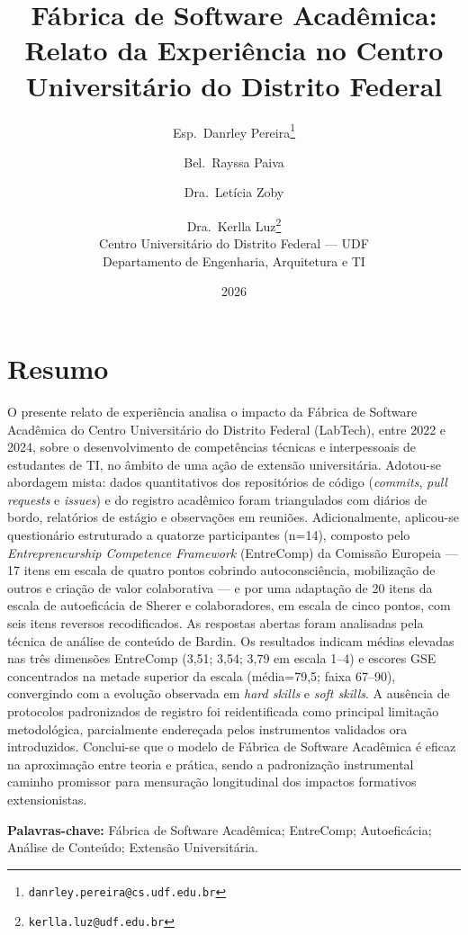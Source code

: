 \documentclass[12pt,a4paper]{article}
\title{\textbf{F\'abrica de Software Acad\^emica:\\
Relato da Experi\^encia no Centro Universit\'ario do Distrito Federal}}
\author{
  Esp.~Danrley Pereira\thanks{\texttt{danrley.pereira@cs.udf.edu.br}} \and
  Bel.~Rayssa Paiva \and
  Dra.~Let\'icia Zoby \and
  Dra.~Kerlla Luz\thanks{\texttt{kerlla.luz@udf.edu.br}} \\
  \small Centro Universit\'ario do Distrito Federal --- UDF \\
  \small Departamento de Engenharia, Arquitetura e TI
}
\date{2026}
\begin{document}
\maketitle

\section*{Resumo}
O presente relato de experi\^encia analisa o impacto da F\'abrica de
Software Acad\^emica do Centro Universit\'ario do Distrito Federal
(LabTech), entre 2022 e 2024, sobre o desenvolvimento de compet\^encias
t\'ecnicas e interpessoais de estudantes de TI, no \^ambito de uma a\c{c}\~ao
de extens\~ao universit\'aria. Adotou-se abordagem mista: dados
quantitativos dos reposit\'orios de c\'odigo (\emph{commits},
\emph{pull requests} e \emph{issues}) e do registro acad\^emico foram
triangulados com di\'arios de bordo, relat\'orios de est\'agio e observa\c{c}\~oes
em reuni\~oes. Adicionalmente, aplicou-se question\'ario estruturado a
quatorze participantes (n=14), composto pelo \emph{Entrepreneurship
Competence Framework} (EntreComp) da Comiss\~ao Europeia --- 17 itens em
escala de quatro pontos cobrindo autoconsci\^encia, mobiliza\c{c}\~ao de outros
e cria\c{c}\~ao de valor colaborativa --- e por uma adapta\c{c}\~ao de 20
itens da escala de autoefic\'acia de Sherer e colaboradores, em escala de
cinco pontos, com seis itens reversos recodificados. As respostas abertas foram analisadas pela t\'ecnica de
an\'alise de conte\'udo de Bardin. Os resultados indicam m\'edias elevadas
nas tr\^es dimens\~oes EntreComp (3,51; 3,54; 3,79 em escala 1--4) e
escores GSE concentrados na metade superior da escala (m\'edia=79,5;
faixa 67--90), convergindo com a evolu\c{c}\~ao observada em \emph{hard skills}
e \emph{soft skills}. A aus\^encia de protocolos padronizados de registro
foi reidentificada como principal limita\c{c}\~ao metodol\'ogica, parcialmente
endere\c{c}ada pelos instrumentos validados ora introduzidos. Conclui-se que
o modelo de F\'abrica de Software Acad\^emica \'e eficaz na aproxima\c{c}\~ao
entre teoria e pr\'atica, sendo a padroniza\c{c}\~ao instrumental caminho
promissor para mensura\c{c}\~ao longitudinal dos impactos formativos
extensionistas.

\noindent\textbf{Palavras-chave:} F\'abrica de Software Acad\^emica;
EntreComp; Autoefic\'acia; An\'alise de Conte\'udo; Extens\~ao Universit\'aria.
\end{document}
